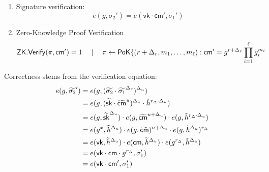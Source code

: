 \begin{enumerate}
    \item Signature verification:
    \[
    e(g, \widetilde{\sigma_2}') = e(\mathsf{vk} \cdot \mathsf{cm}',\widetilde{\sigma_1}')
    \]
    \item Zero-Knowledge Proof Verification
    \[
    \mathsf{ZK.Verify}(\pi, \mathsf{cm}') = 1 \quad \mid \quad \pi \gets \mathsf{PoK}\{(r + \Delta_r, m_1,\ldots,m_\ell): \mathsf{cm}' = g^{r + \Delta_r} \prod_{i=1}^\ell g_i^{m_i}
    \]
\end{enumerate}

Correctness stems from the verification equation:
    \begin{align*}
        e(g, \widetilde{\sigma_2}') &= e(g, (\widetilde{\sigma_2} \cdot \widetilde{\sigma_1}^{\Delta_r})^{\Delta_u}) \\
        &= e(g, (\widetilde{\mathsf{sk}} \cdot \widetilde{\mathsf{cm}}^{u})^{\Delta_u} \cdot \tilde{h}^{r_{\Delta} \cdot \Delta_u}) \\
        &= e(g, \widetilde{\mathsf{sk}}^{\Delta_u}) \cdot e(g, \widetilde{\mathsf{cm}}^{u + \Delta_u}) \cdot e(g,\tilde{h}^{r_{\Delta} \cdot \Delta_u}) \\
        &= e(g^x, \widetilde{h}^{\Delta_u}) \cdot e(g, \widetilde{\mathsf{cm}})^{u + \Delta_u} \cdot e(g,\tilde{h}^{\Delta_u})^{r_{\Delta}} \\
        &= e(\mathsf{vk}, \widetilde{h}^{\Delta_u}) \cdot e(\mathsf{cm}, \widetilde{h}^{\Delta_u}) \cdot e(g^{r_{\Delta}},\tilde{h}^{\Delta_u}) \\
        &= e(\mathsf{vk} \cdot \mathsf{cm} \cdot g^{r_{\Delta}}, \sigma_1')  \\
        &= e(\mathsf{vk} \cdot \mathsf{cm}', \sigma_1')  \\
    \end{align*}







































